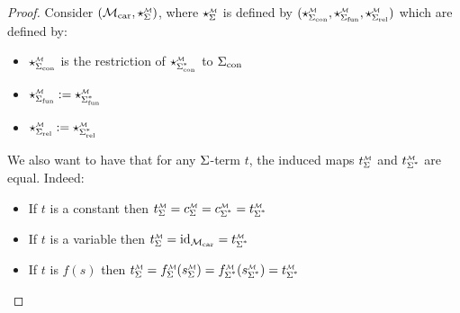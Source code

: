 \begin{proof}
    Consider $(\carrier{\MM},\intp{\Si}{\MM})$, 
    where $\intp{\Si}{\MM}$ is defined by 
    $(\intp{\const{\Si}}{\MM},\intp{\func{\Si}}{\MM},\intp{\rel{\Si}}{\MM})$ 
    which are defined by:
    \begin{itemize}
        \item $\intp{\const{\Si}}{\MM}$ is
        the restriction of $\intp{\const{\Si^*}}{\MM}$ to $\Sigma_\mathrm{con}$
        \item $\intp{\func{\Si}}{\MM}:=\intp{\func{\Si^*}}{\MM}$
        \item $\intp{\rel{\Si}}{\MM}:=\intp{\rel{\Si^*}}{\MM}$
    \end{itemize}
    We also want to have that for any $\Sigma$-term $t$, 
    the induced maps
    $\subintp{\Si}{\MM}{t}$ and $ \subintp{\Si^*}{\MM}{t}$
    are equal.
    Indeed:
    \begin{itemize}
        \item If $t$ is a constant then 
        $\subintp{\Si}{\MM}{t} = \subintp{\Si}{\MM}{c} =
        \subintp{\Si^*}{\MM}{c} = \subintp{\Si^*}{\MM}{t}$
        \item If $t$ is a variable then 
        $\subintp{\Si}{\MM}{t} = \id{\carrier{\MM}} =
        \subintp{\Si^*}{\MM}{t}$
        \item If $t$ is $f(s)$ then 
        $\subintp{\Si}{\MM}{t} = \subintp{\Si}{\MM}{f}(\subintp{\Si}{\MM}{s}) =
        \subintp{\Si^*}{\MM}{f}(\subintp{\Si^*}{\MM}{s}) = \subintp{\Si^*}{\MM}{t} $
    \end{itemize}
    

\end{proof}
